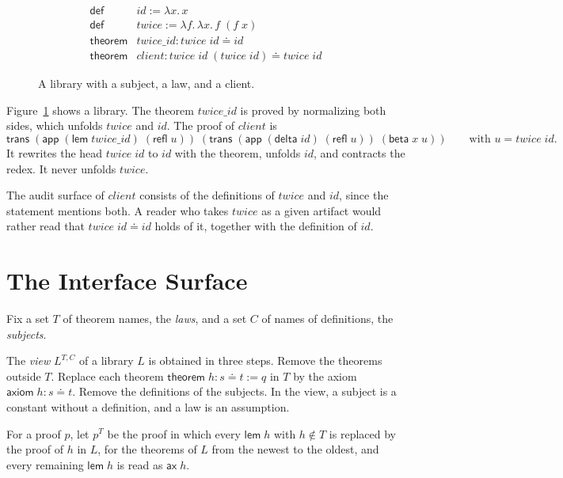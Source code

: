 \documentclass[acmsmall,nonacm,screen]{acmart}
\newcommand{\eqd}{\doteq}
\newcommand{\kw}[1]{\mathsf{#1}}
\newcommand{\nm}[1]{\mathit{#1}}
\newcommand{\view}[1]{#1^{T,C}}
\begin{document}
\begin{figure}
\[
\begin{array}{ll}
\kw{def} & \nm{id} := \lambda x.\,x \\
\kw{def} & \nm{twice} := \lambda f.\,\lambda x.\,f\;(f\;x) \\
\kw{theorem} & \nm{twice\_id} : \nm{twice}\;\nm{id} \eqd \nm{id} \\
\kw{theorem} & \nm{client} : \nm{twice}\;\nm{id}\;(\nm{twice}\;\nm{id}) \eqd \nm{twice}\;\nm{id}
\end{array}
\]
\caption{A library with a subject, a law, and a client.}
\label{fig:example}
\end{figure}

Figure~\ref{fig:example} shows a library. The theorem $\nm{twice\_id}$ is proved by normalizing
both sides, which unfolds $\nm{twice}$ and $\nm{id}$. The proof of $\nm{client}$ is
\[
\kw{trans}\;(\kw{app}\;(\kw{lem}\;\nm{twice\_id})\;(\kw{refl}\;u))\;
  (\kw{trans}\;(\kw{app}\;(\kw{delta}\;\nm{id})\;(\kw{refl}\;u))\;(\kw{beta}\;x\;u))
\qquad\text{with } u = \nm{twice}\;\nm{id} .
\]
It rewrites the head $\nm{twice}\;\nm{id}$ to $\nm{id}$ with the theorem, unfolds $\nm{id}$, and
contracts the redex. It never unfolds $\nm{twice}$.

The audit surface of $\nm{client}$ consists of the definitions of $\nm{twice}$ and $\nm{id}$,
since the statement mentions both. A reader who takes $\nm{twice}$ as a given artifact would
rather read that $\nm{twice}\;\nm{id} \eqd \nm{id}$ holds of it, together with the definition of
$\nm{id}$.

\section{The Interface Surface}
\label{sec:iface}

Fix a set $T$ of theorem names, the \emph{laws}, and a set $C$ of names of definitions, the
\emph{subjects}.

The \emph{view} $\view{L}$ of a library $L$ is obtained in three steps. Remove the theorems
outside $T$. Replace each theorem $\kw{theorem}\;h : s \eqd t := q$ in $T$ by the axiom
$\kw{axiom}\;h : s \eqd t$. Remove the definitions of the subjects. In the view, a subject is a
constant without a definition, and a law is an assumption.

For a proof $p$, let $p^T$ be the proof in which every $\kw{lem}\;h$ with $h \notin T$ is
replaced by the proof of $h$ in $L$, for the theorems of $L$ from the newest to the oldest, and
every remaining $\kw{lem}\;h$ is read as $\kw{ax}\;h$.
\end{document}
